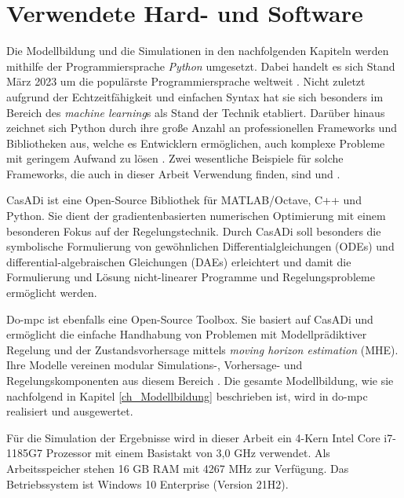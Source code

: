 \section{Verwendete Hard- und Software} \label{sec_HardSoftware}
Die Modellbildung und die Simulationen in den nachfolgenden Kapiteln werden mithilfe der Programmiersprache \textit{Python} umgesetzt.
Dabei handelt es sich Stand März 2023 um die populärste Programmiersprache weltweit \cite{Statista}.
Nicht zuletzt aufgrund der Echtzeitfähigkeit \cite[S.9]{Python} und einfachen Syntax hat sie sich besonders im Bereich des \textit{machine learning}s als Stand der Technik etabliert.
Darüber hinaus zeichnet sich Python durch ihre große Anzahl an professionellen Frameworks und Bibliotheken aus, welche es Entwicklern ermöglichen, auch komplexe Probleme mit geringem Aufwand zu lösen \cite[S.3]{Python}.
Zwei wesentliche Beispiele für solche Frameworks, die auch in dieser Arbeit Verwendung finden, sind  und .

CasADi ist eine Open-Source Bibliothek für MATLAB/Octave, C++ und Python.
Sie dient der gradientenbasierten numerischen Optimierung mit einem besonderen Fokus auf der Regelungstechnik.
Durch CasADi soll besonders die symbolische Formulierung von gewöhnlichen Differentialgleichungen (ODEs) und differential-algebraischen Gleichungen (DAEs) erleichtert und damit die Formulierung und Lösung nicht-linearer Programme und Regelungsprobleme ermöglicht werden. \cite{Casadi}

Do-mpc ist ebenfalls eine Open-Source Toolbox.
Sie basiert auf CasADi und ermöglicht die einfache Handhabung von Problemen mit Modellprädiktiver Regelung und der Zustandsvorhersage mittels \textit{moving horizon estimation} (MHE).
Ihre Modelle vereinen modular \mbox{Simulations-,} Vorhersage- und Regelungskomponenten aus diesem Bereich \cite{Dompc2}.
Die gesamte Modellbildung, wie sie nachfolgend in Kapitel \ref{ch_Modellbildung} beschrieben ist, wird in do-mpc realisiert und ausgewertet.

Für die Simulation der Ergebnisse wird in dieser Arbeit ein 4-Kern Intel Core i7-1185G7 Prozessor mit einem Basistakt von 3,0 GHz verwendet.
Als Arbeitsspeicher stehen 16 GB RAM mit 4267 MHz zur Verfügung.
Das Betriebssystem ist Windows 10 Enterprise (Version 21H2).
